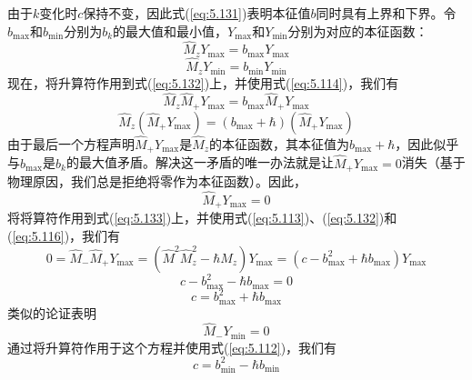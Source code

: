     由于$k$变化时$c$保持不变，因此式(\ref{eq:5.131})表明本征值$b$同时具有上界和下界。令$b_{\max}$和$b_{\min}$分别为$b_k$的最大值和最小值，$Y_{\max}$和$Y_{\min}$分别为对应的本征函数：
    \begin{equation}
        \hat{M}_zY_{\max} = b_{\max}Y_{\max}
        \label{eq:5.132}
    \end{equation}
    \begin{equation}
        \hat{M}_zY_{\min} = b_{\min}Y_{\min}
        \label{eq:5.133}
    \end{equation}
    现在，将升算符作用到式(\ref{eq:5.132})上，并使用式(\ref{eq:5.114})，我们有
    \begin{equation*}
        \hat{M}_z\hat{M}_+Y_{\max} = b_{\max}\hat{M}_+Y_{\max}
    \end{equation*}
    \begin{equation}
        \hat{M}_z\left(\hat{M}_+Y_{\max}\right) = \left(b_{\max}+\hbar\right)\left(\hat{M}_+Y_{\max}\right)
        \label{eq:5.134}
    \end{equation}
    由于最后一个方程声明$\hat{M}_+Y_{\max}$是$\hat{M}_z$的本征函数，其本征值为$b_{\max}+\hbar$，因此似乎与$b_{\max}$是$b_k$的最大值矛盾。解决这一矛盾的唯一办法就是让$\hat{M}_+Y_{\max} = 0$消失（基于物理原因，我们总是拒绝将零作为本征函数）。因此，
    \begin{equation}
        \hat{M}_+Y_{\max} = 0
        \label{eq:5.135}
    \end{equation}
    将将算符作用到式(\ref{eq:5.133})上，并使用式(\ref{eq:5.113})、(\ref{eq:5.132})和(\ref{eq:5.116})，我们有
    \begin{equation*}
        0 = \hat{M}_-\hat{M}_+Y_{\max} = \left(\hat{M}^2\hat{M}_z^2-\hbar\hat{M}_z\right)Y_{\max} = \left(c-b_{\max}^2+\hbar b_{\max}\right)Y_{\max}
    \end{equation*}
    \begin{equation*}
        c - b_{\max}^2 - \hbar b_{\max} = 0
    \end{equation*}
    \begin{equation}
        c = b_{\max}^2 + \hbar b_{\max}
        \label{eq:5.136}
    \end{equation}
    类似的论证表明
    \begin{equation}
        \hat{M}_-Y_{\min} = 0
        \label{eq:5.137}
    \end{equation}
    通过将升算符作用于这个方程并使用式(\ref{eq:5.112})，我们有
    \begin{equation*}
        c = b^2_{\min} - \hbar b_{\min}
    \end{equation*}
